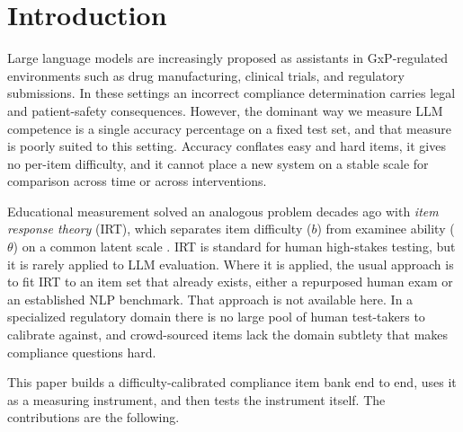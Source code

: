 \section{Introduction}
\label{sec:intro}

Large language models are increasingly proposed as assistants in
GxP-regulated environments such as drug manufacturing, clinical trials,
and regulatory submissions. In these settings an incorrect compliance
determination carries legal and patient-safety consequences. However, the
dominant way we measure LLM competence is a single accuracy percentage on
a fixed test set, and that measure is poorly suited to this setting.
Accuracy conflates easy and hard items, it gives no per-item difficulty,
and it cannot place a new system on a stable scale for comparison across
time or across interventions.

Educational measurement solved an analogous problem decades ago with
\emph{item response theory} (IRT), which separates item difficulty ($b$)
from examinee ability ($\theta$) on a common latent scale
\citep{lord1980,rasch1960}. IRT is standard for human high-stakes
testing, but it is rarely applied to LLM evaluation. Where it is applied,
the usual approach is to fit IRT to an item set that already exists,
either a repurposed human exam or an established NLP benchmark. That
approach is not available here. In a specialized regulatory domain there
is no large pool of human test-takers to calibrate against, and
crowd-sourced items lack the domain subtlety that makes compliance
questions hard.

This paper builds a difficulty-calibrated compliance item bank end to
end, uses it as a measuring instrument, and then tests the instrument
itself. The contributions are the following.

